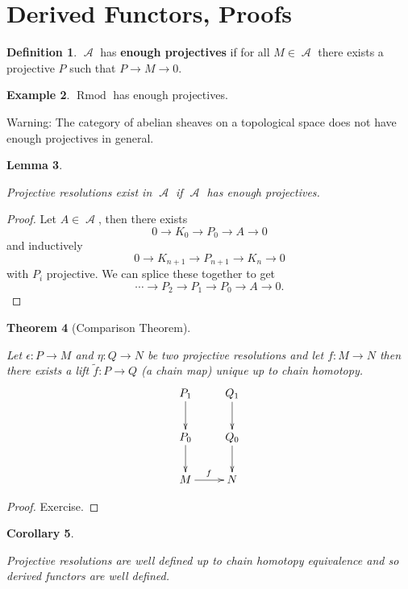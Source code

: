 \documentclass[10pt,]{book}
\newcommand{\terminology}[1]{\textbf{#1}}
\theoremstyle{plain}
\newtheorem{theorem}{Theorem}[section]
\newtheorem{corollary}[theorem]{Corollary}
\newtheorem{lemma}[theorem]{Lemma}
\theoremstyle{definition}
\newtheorem{definition}[theorem]{Definition}
\newtheorem{example}[theorem]{Example}
\numberwithin{equation}{section}
\DeclareMathOperator{\Rmod}{R\text{mod}}
\DeclareMathOperator{\cA}{\mathcal{A}}
\begin{document}
\section[Derived Functors, Proofs]{Derived Functors, Proofs}\label{sec-derived-proofs}
\begin{definition}\label{definition-20}
\(\cA\) has \terminology{enough projectives} if for all \(M\in \cA\) there exists a projective \(P\) such that \(P \to M \to 0\).\end{definition}
\begin{example}\label{example-12}
\(\Rmod\) has enough projectives.
          \end{example}

          Warning: The category of abelian sheaves on a topological space does not have enough projectives in general.
\begin{lemma}\label{lemma-5}

            Projective resolutions exist in \(\cA\) if \(\cA\) has enough projectives.
          \end{lemma}
\begin{proof}

            Let \(A\in \cA\), then there exists
            \[
              0 \to K_0 \to P_0 \to A \to 0
            \]
            and inductively
            \[
              0 \to K_{n+1} \to P_{n+1} \to K_n \to 0
            \]
            with \(P_i\) projective.
            We can splice these together to get 
            \[
              \cdots \to P_2 \to P_1 \to P_0 \to A \to 0.
            \]\end{proof}
\begin{theorem}[Comparison Theorem]\label{theorem-2}

            Let \(\epsilon \colon P \to M\) and \(\eta \colon Q \to N\) be two projective resolutions and let \(f\colon M \to N\) then there exists a lift \(\tilde{f} \colon P \to Q\) (a chain map) unique up to chain homotopy.
            \[
              \xymatrix{
                P_1 \ar[d] & Q_1\ar[d]\\
                P_0 \ar[d] & Q_0\ar[d]\\
                M \ar[r]^{f} & N\\
              }
            \]\end{theorem}
\begin{proof}
Exercise.\end{proof}
\begin{corollary}\label{corollary-2}

            Projective resolutions are well defined up to chain homotopy equivalence and so derived functors are well defined.
          \end{corollary}
\end{document}
